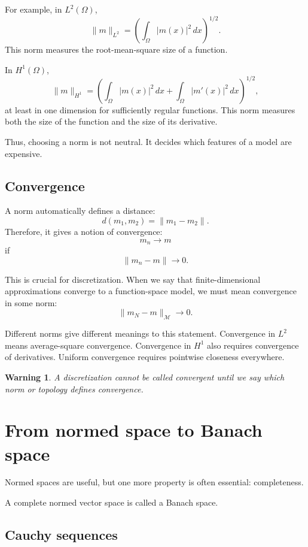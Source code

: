 \documentclass[11pt,a4paper]{book}
\newtheorem{warning}[definition]{Warning}
\newcommand{\M}{\mathcal{M}}      %
\begin{document}
For example, in $L^2(\Omega)$,
\[
    \|m\|_{L^2}
    =
    \left(
        \int_\Omega |m(x)|^2\,dx
    \right)^{1/2}.
\]
This norm measures the root-mean-square size of a function.

In $H^1(\Omega)$,
\[
    \|m\|_{H^1}
    =
    \left(
        \int_\Omega |m(x)|^2\,dx
        +
        \int_\Omega |m'(x)|^2\,dx
    \right)^{1/2},
\]
at least in one dimension for sufficiently regular functions. This norm
measures both the size of the function and the size of its derivative.

Thus, choosing a norm is not neutral. It decides which features of a model are
expensive.

\subsection{Convergence}

A norm automatically defines a distance:
\[
    d(m_1,m_2)
    =
    \|m_1-m_2\|.
\]
Therefore, it gives a notion of convergence:
\[
    m_n \to m
\]
if
\[
    \|m_n-m\|\to 0.
\]

This is crucial for discretization. When we say that finite-dimensional
approximations converge to a function-space model, we must mean convergence in
some norm:
\[
    \|m_N-m\|_{\M}\to 0.
\]

Different norms give different meanings to this statement. Convergence in
$L^2$ means average-square convergence. Convergence in $H^1$ also requires
convergence of derivatives. Uniform convergence requires pointwise closeness
everywhere.

\begin{warning}
A discretization cannot be called convergent until we say which norm or topology
defines convergence.
\end{warning}

\section{From normed space to Banach space}

Normed spaces are useful, but one more property is often essential:
completeness.

A complete normed vector space is called a Banach space.

\subsection{Cauchy sequences}
\end{document}
